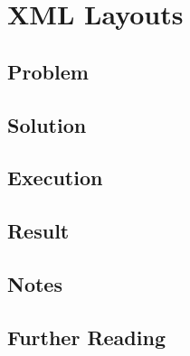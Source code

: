 \section{XML Layouts} %
\subsection*{Problem}

\subsection*{Solution}

\subsection*{Execution}

\subsection*{Result}

\subsection*{Notes}

\subsection*{Further Reading}
